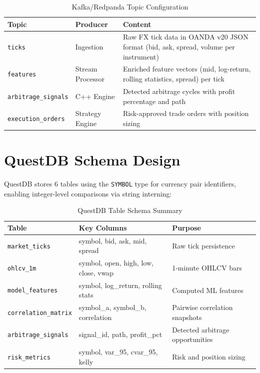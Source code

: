 \documentclass[letterpaper,11pt]{report}
\begin{document}
\begin{table}[h]
\centering
\caption{Kafka/Redpanda Topic Configuration}
\begin{tabular}{llp{7cm}}
\toprule
\textbf{Topic} & \textbf{Producer} & \textbf{Content} \\
\midrule
\texttt{ticks} & Ingestion & Raw FX tick data in OANDA v20 JSON format (bid, ask, spread, volume per instrument) \\
\texttt{features} & Stream Processor & Enriched feature vectors (mid, log-return, rolling statistics, spread) per tick \\
\texttt{arbitrage\_signals} & C++ Engine & Detected arbitrage cycles with profit percentage and path \\
\texttt{execution\_orders} & Strategy Engine & Risk-approved trade orders with position sizing \\
\bottomrule
\end{tabular}
\end{table}

\section{QuestDB Schema Design}

QuestDB stores 6 tables using the \texttt{SYMBOL} type for currency pair identifiers, enabling integer-level comparisons via string interning:

\begin{table}[h]
\centering
\caption{QuestDB Table Schema Summary}
\begin{tabular}{llp{6.5cm}}
\toprule
\textbf{Table} & \textbf{Key Columns} & \textbf{Purpose} \\
\midrule
\texttt{market\_ticks} & symbol, bid, ask, mid, spread & Raw tick persistence \\
\texttt{ohlcv\_1m} & symbol, open, high, low, close, vwap & 1-minute OHLCV bars \\
\texttt{model\_features} & symbol, log\_return, rolling stats & Computed ML features \\
\texttt{correlation\_matrix} & symbol\_a, symbol\_b, correlation & Pairwise correlation snapshots \\
\texttt{arbitrage\_signals} & signal\_id, path, profit\_pct & Detected arbitrage opportunities \\
\texttt{risk\_metrics} & symbol, var\_95, cvar\_95, kelly & Risk and position sizing \\
\bottomrule
\end{tabular}
\end{table}
\end{document}
